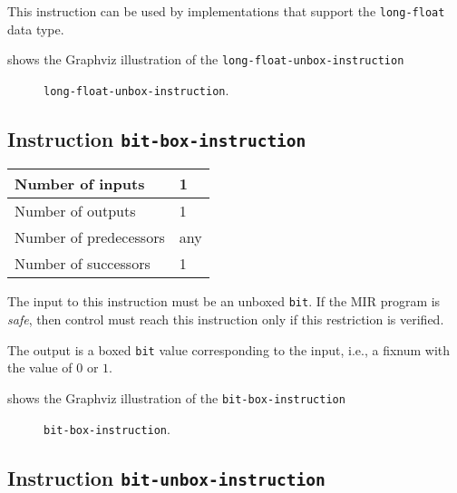 This instruction can be used by implementations that support the
\texttt{long-float} data type.   

 shows the Graphviz illustration of the
\texttt{long-float-unbox-instruction}

\begin{figure}
\begin{center}
\end{center}
\caption{\label{fig-long-float-unbox-instruction}
\texttt{long-float-unbox-instruction}.}
\end{figure}

\subsection{Instruction \texttt{bit-box-instruction}}
\label{mir-instruction-bit-box}

\begin{tabular}{|l|l|}
\hline
Number of inputs & 1\\
\hline
Number of outputs & 1\\
\hline
Number of predecessors & any\\
\hline
Number of successors & 1\\
\hline
\end{tabular}

The input to this instruction must be an unboxed \texttt{bit}.
If the MIR program is \emph{safe}, then control must reach
this instruction only if this restriction is verified.

The output is a boxed \texttt{bit} value corresponding to the
input, i.e., a fixnum with the value of $0$ or $1$. 

 shows the Graphviz illustration of the
\texttt{bit-box-instruction}

\begin{figure}
\begin{center}
\end{center}
\caption{\label{fig-bit-box-instruction}
\texttt{bit-box-instruction}.}
\end{figure}

\subsection{Instruction \texttt{bit-unbox-instruction}}
\label{mir-instruction-bit-unbox}

